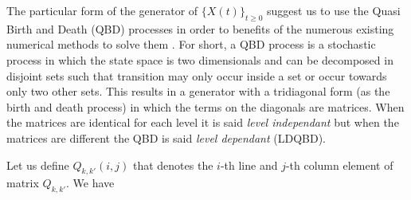 \documentclass[conference]{IEEEtran}
\begin{document}
The particular form of the generator of $\{X(t)\}_{t \geq 0}$ suggest us to use the Quasi Birth and Death (QBD) processes in order to benefits of the numerous
existing numerical methods to solve them \cite{Neuts1981}. For short, a QBD process is a stochastic process in which the state space is two dimensionals
and can be decomposed in disjoint sets such that transition may only occur inside a set or occur towards only two other sets.
This results in a generator with a tridiagonal form (as the birth and death process) in which the terms on the diagonals are matrices.
When the matrices are identical for each level it is said \emph{level independant} but when the matrices are different the QBD
is said \emph{level dependant} (LDQBD).


Let us define $Q_{k,k'}(i,j)$ that denotes the $i$-th line and $j$-th column element of matrix $Q_{k,k'}$. We have
\end{document}
